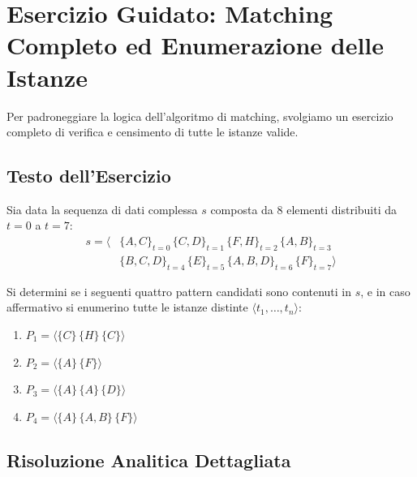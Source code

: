 \FloatBarrier
\section{Esercizio Guidato: Matching Completo ed Enumerazione delle Istanze}
\label{sec:dm-seq-exercise}

Per padroneggiare la logica dell'algoritmo di matching, svolgiamo un esercizio completo di verifica e censimento di tutte le istanze valide.

\FloatBarrier
\subsection{Testo dell'Esercizio}
Sia data la sequenza di dati complessa $s$ composta da 8 elementi distribuiti da $t = 0$ a $t = 7$:
\begin{equation}
\label{eq:seq-exercise-input}
\begin{split}
s = \langle &\{A, C\}_{t=0} \, \{C, D\}_{t=1} \, \{F, H\}_{t=2} \, \{A, B\}_{t=3} \\
&\{B, C, D\}_{t=4} \, \{E\}_{t=5} \, \{A, B, D\}_{t=6} \, \{F\}_{t=7} \rangle
\end{split}
\end{equation}

Si determini se i seguenti quattro pattern candidati sono contenuti in $s$, e in caso affermativo si enumerino tutte le istanze distinte $\langle t_1, \dots, t_n \rangle$:
\begin{enumerate}
    \item $P_1 = \langle \{C\} \, \{H\} \, \{C\} \rangle$
    \item $P_2 = \langle \{A\} \, \{F\} \rangle$
    \item $P_3 = \langle \{A\} \, \{A\} \, \{D\} \rangle$
    \item $P_4 = \langle \{A\} \, \{A, B\} \, \{F\} \rangle$
\end{enumerate}

\FloatBarrier
\subsection{Risoluzione Analitica Dettagliata}

